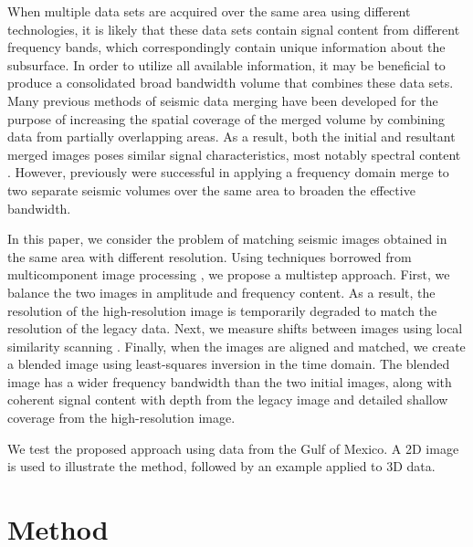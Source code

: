 When multiple data sets are acquired over the same area using different technologies, it is likely that these data sets contain signal content from different frequency bands, which correspondingly contain unique information about the subsurface.
In order to utilize all available information, it may be beneficial to produce a consolidated broad bandwidth volume that combines these data sets.
Many previous methods of seismic data merging have been developed for the purpose of increasing the spatial coverage of the merged volume by combining data from partially overlapping areas.
As a result, both the initial and resultant merged images poses similar signal characteristics, most notably spectral content \cite[]{kavery,gabor,supermerge}.
However, previously \cite{freqmerge} were successful in applying a frequency domain merge to two separate seismic volumes over the same area to broaden the effective bandwidth.

In this paper, we consider the problem of matching seismic images obtained in the same area with different resolution.
Using techniques borrowed from multicomponent image processing \cite[]{warp}, we propose a multistep approach.
First, we balance the two images in amplitude and frequency content.
As a result, the resolution of the high-resolution image is temporarily degraded to match the resolution of the legacy data.
Next, we measure shifts between images using local similarity scanning \cite[]{attr,timelapse}.
Finally, when the images are aligned and matched, we create a blended image using least-squares inversion in the time domain.
The blended image has a wider frequency bandwidth than the two initial images, along with coherent signal content with depth from the legacy image and detailed shallow coverage from the high-resolution image.

We test the proposed approach using data from the Gulf of Mexico.
A 2D image is used to illustrate the method, followed by an example applied to 3D data.




\section{Method}

